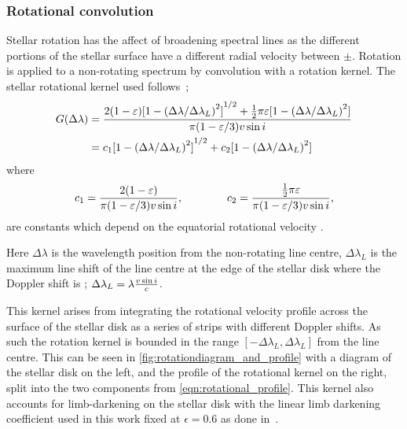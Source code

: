 \subsubsection*{Rotational convolution}
\label{subsubsec:rotational_convolution}
Stellar rotation has the affect of broadening spectral lines as the different portions of the stellar surface have a different radial velocity between \(\pm\)\Vsini{}.
Rotation is applied to a non-rotating spectrum by convolution with a rotation kernel.
The stellar rotational kernel used follows~\citet{gray_observation_2005};
\begin{align}
G(\Delta\lambda) &= \frac{2(1-\varepsilon){[1-{(\Delta\lambda /{\Delta\lambda}_{L})}^{2}]}^{1/2} + \frac{1}{2}\pi\varepsilon[1-{(\Delta\lambda /{\Delta\lambda}_{L})}^{2}]}{\pi (1-\varepsilon/3) v\sin{i}}\\
&= c_{1}{[1- {(\Delta\lambda /\Delta\lambda_{L})}^{2}]}^{1/2} + c_{2}[1-{(\Delta\lambda /\Delta\lambda_{L})}^{2}] \label{eqn:rotational_profile}
\end{align}
where
\begin{equation}
{c}_{1} = \frac{2(1-\varepsilon)} {\pi (1-\varepsilon/3)v\sin{i}}, \hspace{4em} {c}_{2} = \frac{\frac{1}{2}\pi\varepsilon} {\pi (1-\varepsilon/3)v\sin{i}},
\end{equation}
are constants which depend on the equatorial rotational velocity \Vsini{}.

Here $\Delta\lambda$ is the wavelength position from the non-rotating line centre, $\Delta\lambda_{L}$ is the maximum line shift of the line centre at the edge of the stellar disk where the Doppler shift is \Vsini{}; $\Delta\lambda_{L} = \lambda \frac{v\sin{i}}{c}$.

This kernel arises from integrating the rotational velocity profile across the surface of the stellar disk as a series of strips with different Doppler shifts.
As such the rotation kernel is bounded in the range $[-\Delta\lambda_L, \Delta\lambda_{L}]$ from the line centre.
This can be seen in \cref{fig:rotationdiagram_and_profile} with a diagram of the stellar disk on the left, and the profile of the rotational kernel on the right, split into the two components from \cref{eqn:rotational_profile}.
This kernel also accounts for limb-darkening on the stellar disk with the linear limb darkening coefficient used in this work fixed at $\epsilon=0.6$ as done in~\citet{figueira_radial_2016}.

